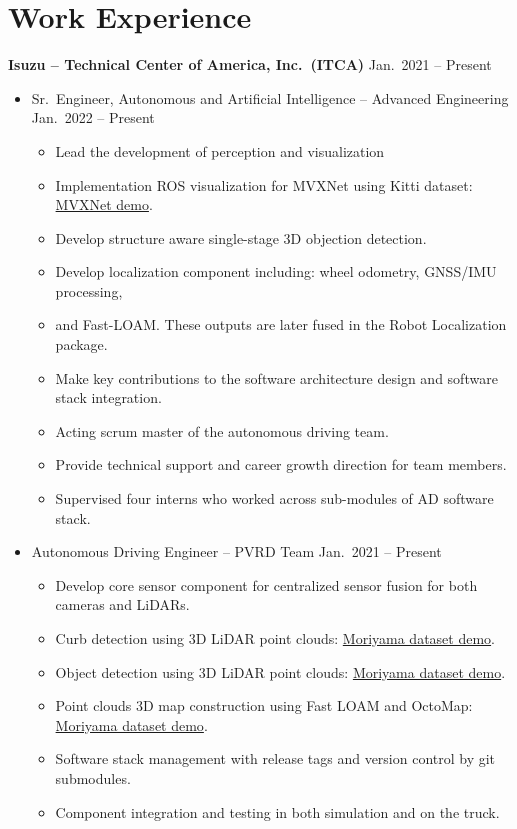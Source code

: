 \documentclass[a4paper,10pt,dvipdfmx]{article}
\begin{document}
\section*{Work Experience}
\textbf{Isuzu -- Technical Center of America, Inc.~(ITCA)} \hfill Jan.~2021 -- Present
\begin{itemize}[noitemsep,nolistsep]
  \item[] Sr.~Engineer, Autonomous and Artificial Intelligence -- Advanced Engineering \hfill Jan.~2022 -- Present
    \begin{itemize}[noitemsep,nolistsep]
      \item Lead the development of perception and visualization
      \item[] Implementation ROS visualization for MVXNet using Kitti dataset: \href{https://youtu.be/LQHUm6AnVdg}{MVXNet demo}.
      \item[] Develop structure aware single-stage 3D objection detection.
      \item Develop localization component including: wheel odometry, GNSS/IMU processing,
      \item[] and Fast-LOAM. These outputs are later fused in the Robot Localization package.
      \item Make key contributions to the software architecture design and software stack integration.
      \item Acting scrum master of the autonomous driving team.
      \item Provide technical support and career growth direction for team members.
      \item Supervised four interns who worked across sub-modules of AD software stack.
    \end{itemize}
  \item[] Autonomous Driving Engineer -- PVRD Team \hfill Jan.~2021 -- Present
    \begin{itemize}[noitemsep,nolistsep]
      \item Develop core sensor component for centralized sensor fusion for both cameras and LiDARs.
      \item Curb detection using 3D LiDAR point clouds: \href{https://youtu.be/ifXtkfOTIvU}{Moriyama dataset demo}.
      \item Object detection using 3D LiDAR point clouds: \href{https://youtu.be/fAb4NLzuoVs}{Moriyama dataset demo}.
      \item Point clouds 3D map construction using Fast LOAM and OctoMap: \href{https://youtu.be/j3xpDWPfBtw}{Moriyama dataset demo}.
      \item Software stack management with release tags and version control by git submodules.
      \item Component integration and testing in both simulation and on the truck.\\
    \end{itemize}
\end{itemize}
\end{document}

